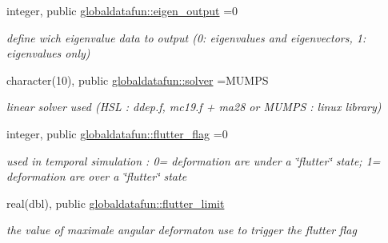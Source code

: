 \begin{DoxyCompactItemize}
integer, public \hyperlink{namespaceglobaldatafun_a312b192a05c2e5b3dd301528abdba07c}{globaldatafun\+::eigen\+\_\+output} =0
\begin{DoxyCompactList}\small\item\em define wich eigenvalue data to output (0\+: eigenvalues and eigenvectors, 1\+: eigenvalues only) \end{DoxyCompactList}\item 
character(10), public \hyperlink{namespaceglobaldatafun_a895a1e10c59021323fcf518893f6c0de}{globaldatafun\+::solver} =\textquotesingle{}M\+U\+M\+PS\textquotesingle{}
\begin{DoxyCompactList}\small\item\em linear solver used (H\+SL \+: ddep.\+f, mc19.\+f + ma28 or M\+U\+M\+PS \+: linux library) \end{DoxyCompactList}\item 
integer, public \hyperlink{namespaceglobaldatafun_a71be24aec97056093e319698ed6df6fd}{globaldatafun\+::flutter\+\_\+flag} =0
\begin{DoxyCompactList}\small\item\em used in temporal simulation \+: 0= deformation are under a \char`\"{}flutter\char`\"{} state; 1= deformation are over a \char`\"{}flutter\char`\"{} state \end{DoxyCompactList}\item 
real(dbl), public \hyperlink{namespaceglobaldatafun_a00437dc044a340393bafc8c15d696e7a}{globaldatafun\+::flutter\+\_\+limit}
\begin{DoxyCompactList}\small\item\em the value of maximale angular deformaton use to trigger the flutter flag \end{DoxyCompactList}\end{DoxyCompactItemize}

